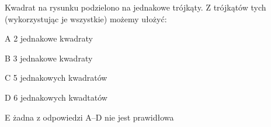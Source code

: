 \begin{tresc}
Kwadrat na rysunku podzielono na jednakowe trójkąty. Z trójkątów tych (wykorzystując je wszystkie) możemy ułożyć:
\end{tresc}
\begin{wariant}{A} 2 jednakowe kwadraty \end{wariant}
\begin{wariant}{B} 3 jednakowe kwadraty \end{wariant}
\begin{wariant}{C} 5 jednakowych kwadratów \end{wariant}
\begin{wariant}{D} 6 jednakowych kwadtatów \end{wariant}
\begin{wariant}{E} żadna z odpowiedzi A–D nie jest prawidłowa \end{wariant}
